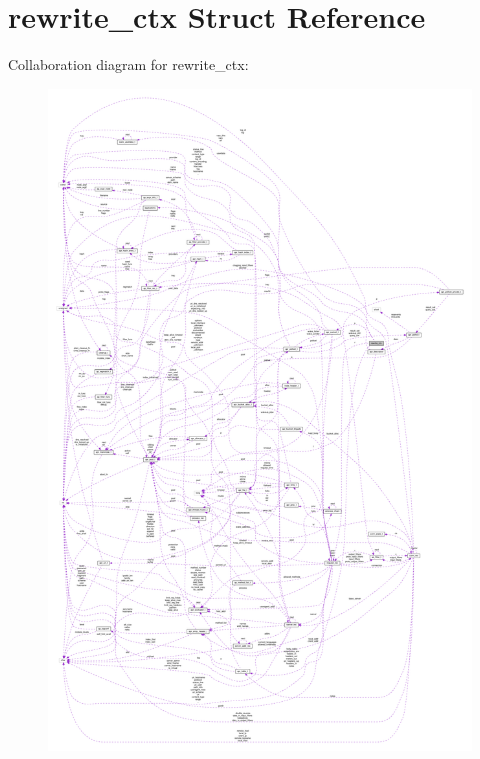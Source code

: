 \hypertarget{structrewrite__ctx}{}\section{rewrite\+\_\+ctx Struct Reference}
\label{structrewrite__ctx}


Collaboration diagram for rewrite\+\_\+ctx\+:
\nopagebreak
\begin{figure}[H]
\begin{center}
\leavevmode
\includegraphics[width=350pt]{structrewrite__ctx__coll__graph}
\end{center}
\end{figure}

